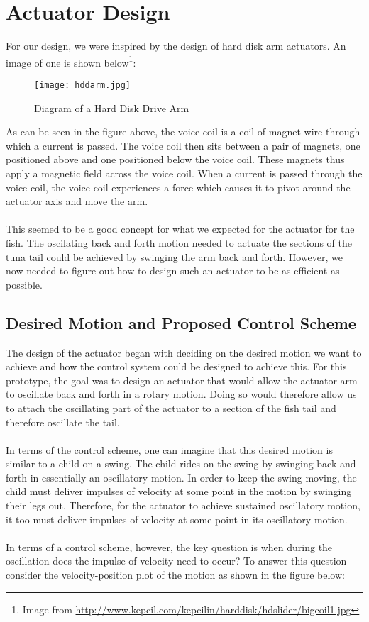 \section{Actuator Design}

For our design, we were inspired by the design of hard disk arm actuators. An image of one is shown below\footnote{Image from \url{http://www.kepcil.com/kepcilin/harddisk/hdslider/bigcoil1.jpg}}:

\begin{figure}[h!]
\centering
\texttt{[image: hddarm.jpg]}
\caption{Diagram of a Hard Disk Drive Arm}
\label{fig:hddarm}
\end{figure}

\noindent As can be seen in the figure above, the voice coil is a coil of magnet wire through which a current is passed. The voice coil then sits between a pair of magnets, one positioned above and one positioned below the voice coil. These magnets thus apply a magnetic field across the voice coil. When a current is passed through the voice coil, the voice coil experiences a force which causes it to pivot around the actuator axis and move the arm. \\ \\
%
This seemed to be a good concept for what we expected for the actuator for the fish. The oscilating back and forth motion needed to actuate the sections of the tuna tail could be achieved by swinging the arm back and forth. However, we now needed to figure out how to design such an actuator to be as efficient as possible.

\newpage
\subsection{Desired Motion and Proposed Control Scheme}
The design of the actuator began with deciding on the desired motion we want to achieve and how the control system could be designed to achieve this. For this prototype, the goal was to design an actuator that would allow the actuator arm to oscillate back and forth in a rotary motion. Doing so would therefore allow us to attach the oscillating part of the actuator to a section of the fish tail and therefore oscillate the tail. \\ \\
%
In terms of the control scheme, one can imagine that this desired motion is similar to a child on a swing. The child rides on the swing by swinging back and forth in essentially an oscillatory motion. In order to keep the swing moving, the child must deliver impulses of velocity at some point in the motion by swinging their legs out. Therefore, for the actuator to achieve sustained oscillatory motion, it too must deliver impulses of velocity at some point in its oscillatory motion. \\ \\
%
In terms of a control scheme, however, the key question is when during the oscillation does the impulse of velocity need to occur? To answer this question consider the velocity-position plot of the motion as shown in the figure below:

